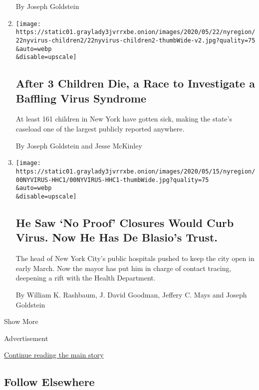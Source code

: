 \begin{enumerate}
  By Joseph Goldstein
\item
  \href{/2020/05/22/nyregion/children-coronavirus-syndrome-new-york.html}{}

  \texttt{[image: https://static01.graylady3jvrrxbe.onion/images/2020/05/22/nyregion/22nyvirus-children2/22nyvirus-children2-thumbWide-v2.jpg?quality=75\\\&auto=webp\\\&disable=upscale]}

  \hypertarget{after-3-children-die-a-race-to-investigate-a-baffling-virus-syndrome}{%
  \subsection{After 3 Children Die, a Race to Investigate a Baffling
  Virus
  Syndrome}\label{after-3-children-die-a-race-to-investigate-a-baffling-virus-syndrome}}

  At least 161 children in New York have gotten sick, making the state's
  caseload one of the largest publicly reported anywhere.

  By Joseph Goldstein and Jesse McKinley
\item
  \href{/2020/05/14/nyregion/coronavirus-de-blasio-mitchell-katz.html}{}

  \texttt{[image: https://static01.graylady3jvrrxbe.onion/images/2020/05/15/nyregion/00NYVIRUS-HHC1/00NYVIRUS-HHC1-thumbWide.jpg?quality=75\\\&auto=webp\\\&disable=upscale]}

  \hypertarget{he-saw-no-proof-closures-would-curb-virus-now-he-has-de-blasios-trust}{%
  \subsection{He Saw `No Proof' Closures Would Curb Virus. Now He Has De
  Blasio's
  Trust.}\label{he-saw-no-proof-closures-would-curb-virus-now-he-has-de-blasios-trust}}

  The head of New York City's public hospitals pushed to keep the city
  open in early March. Now the mayor has put him in charge of contact
  tracing, deepening a rift with the Health Department.

  By William K. Rashbaum, J. David Goodman, Jeffery C. Mays and Joseph
  Goldstein
\end{enumerate}

Show More

Advertisement

\protect\hyperlink{after-mid2}{Continue reading the main story}

\hypertarget{follow-elsewhere}{%
\subsection{Follow Elsewhere}\label{follow-elsewhere}}

